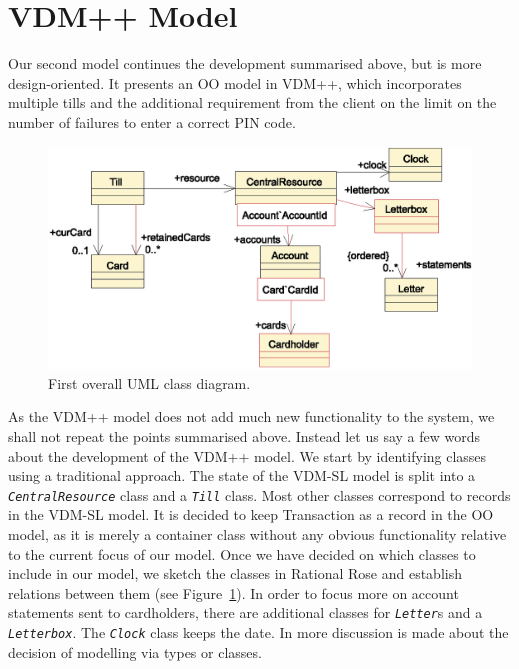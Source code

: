 \documentclass[\pformat,12pt,twoside]{article}
\begin{document}
\section{VDM++ Model}\label{sec:VDMPP}


Our second model continues the development summarised above, 
but is more design-oriented. It presents an OO model in VDM++, 
which incorporates multiple tills and the additional requirement 
from the client on the limit on the number of failures to enter 
a correct PIN code.

\noindent
\begin{figure}[tb]
\begin{center}
\includegraphics[width=.9\textwidth]{classoverview2}
\caption{First overall UML class diagram.\label{fig:VDM++overview}}
\end{center}
\end{figure}

As the VDM++ model does not add much new functionality to the 
system, we shall not repeat the points summarised above. Instead 
let us say a few words about the development of the VDM++ model. 
We start by identifying classes using a traditional approach. 
The state of the VDM-SL model is split into a \texttt{\emph{CentralResource}} 
class and a \texttt{\emph{Till}} class. Most other classes correspond to records 
in the VDM-SL model. It is decided to keep Transaction as a record 
in the OO model, as it is merely a container class without any 
obvious functionality relative to the current focus of our model. 
Once we have decided on which classes to include in our model, 
we sketch the classes in Rational Rose and establish relations 
between them (see Figure~\ref{fig:VDM++overview}). In order to focus more on 
account statements sent to cardholders, there are additional 
classes for \texttt{\emph{Letter}}s and a \texttt{\emph{Letterbox}}. The \texttt{\emph{Clock}} class keeps the 
date. In \cite{Guidelines} more discussion is made about the decision of
modelling via types or classes.
\end{document}

